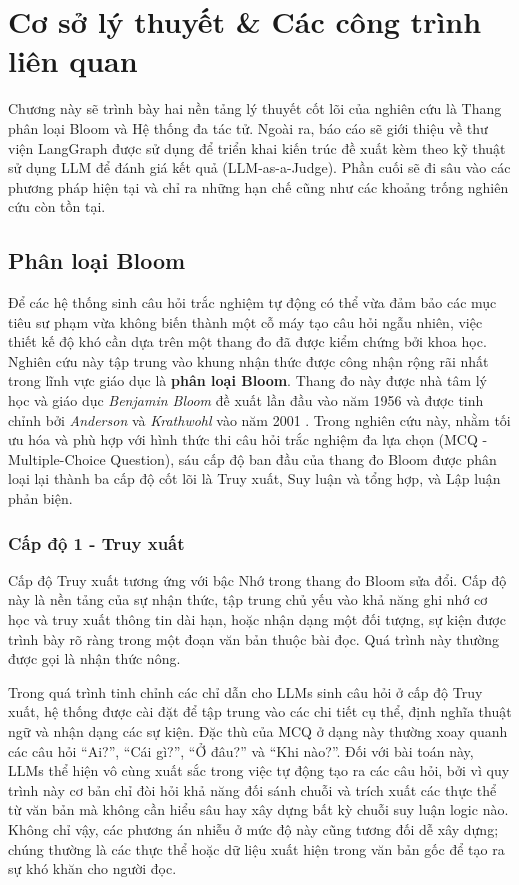 \chapter{Cơ sở lý thuyết \& Các công trình liên quan}
\label{chap:co-so-ly-thuyet}

Chương này sẽ trình bày hai nền tảng lý thuyết cốt lõi của nghiên cứu là Thang phân loại Bloom và Hệ thống đa tác tử. Ngoài ra, báo cáo sẽ giới thiệu về thư viện LangGraph được sử dụng để triển khai kiến trúc đề xuất kèm theo kỹ thuật sử dụng LLM để đánh giá kết quả (LLM-as-a-Judge). Phần cuối sẽ đi sâu vào các phương pháp hiện tại và chỉ ra những hạn chế cũng như các khoảng trống nghiên cứu còn tồn tại.

\section{Phân loại Bloom}

Để các hệ thống sinh câu hỏi trắc nghiệm tự động có thể vừa đảm bảo các mục tiêu sư phạm vừa không biến thành một cỗ máy tạo câu hỏi ngẫu nhiên, việc thiết kế độ khó cần dựa trên một thang đo đã được kiểm chứng bởi khoa học. Nghiên cứu này tập trung vào khung nhận thức được công nhận rộng rãi nhất trong lĩnh vực giáo dục là \textbf{phân loại Bloom}. Thang đo này được nhà tâm lý học và giáo dục \textit{Benjamin Bloom} đề xuất lần đầu vào năm 1956 \cite{bloom1956taxonomy} và được tinh chỉnh bởi \textit{Anderson} và \textit{Krathwohl} vào năm 2001 \cite{anderson2001taxonomy}. Trong nghiên cứu này, nhằm tối ưu hóa và phù hợp với hình thức thi câu hỏi trắc nghiệm đa lựa chọn (MCQ - Multiple-Choice Question), sáu cấp độ ban đầu của thang đo Bloom được phân loại lại thành ba cấp độ cốt lõi là Truy xuất, Suy luận và tổng hợp, và Lập luận phản biện.

\subsection{Cấp độ 1 - Truy xuất}

Cấp độ Truy xuất tương ứng với bậc Nhớ trong thang đo Bloom sửa đổi. Cấp độ này là nền tảng của sự nhận thức, tập trung chủ yếu vào khả năng ghi nhớ cơ học và truy xuất thông tin dài hạn, hoặc nhận dạng một đối tượng, sự kiện được trình bày rõ ràng trong một đoạn văn bản thuộc bài đọc. Quá trình này thường được gọi là nhận thức nông.

Trong quá trình tinh chỉnh các chỉ dẫn cho LLMs sinh câu hỏi ở cấp độ Truy xuất, hệ thống được cài đặt để tập trung vào các chi tiết cụ thể, định nghĩa thuật ngữ và nhận dạng các sự kiện. Đặc thù của MCQ ở dạng này thường xoay quanh các câu hỏi “Ai?”, “Cái gì?”, “Ở đâu?” và “Khi nào?”. Đối với bài toán  này, LLMs thể hiện vô cùng xuất sắc trong việc tự động tạo ra các câu hỏi, bởi vì quy trình này cơ bản chỉ đòi hỏi khả năng đối sánh chuỗi và trích xuất các thực thể từ văn bản mà không cần hiểu sâu hay xây dựng bất kỳ chuỗi suy luận logic nào. Không chỉ vậy, các phương án nhiễu ở mức độ này cũng tương đối dễ xây dựng; chúng thường là các thực thể hoặc dữ liệu xuất hiện trong văn bản gốc để tạo ra sự khó khăn cho người đọc.

